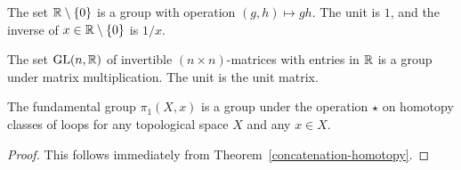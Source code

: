 \begin{example}
  The set $\mathbb{R} \setminus \{0\}$ is a group with operation $(g,h) \mapsto gh$. The unit is $1$, and the inverse of $x \in \mathbb{R} \setminus \{0\}$ is $1/x$.
\end{example}
\begin{example}
  The set $\mathrm{GL}(n,\mathbb{R})$ of invertible $(n \times n)$-matrices with entries in $\mathbb{R}$ is a group under matrix multiplication. The unit is the unit matrix.
\end{example}
\begin{prop}
  The fundamental group $\pi_1(X,x)$ is a group under the operation $\star$ on homotopy classes of loops for any topological space $X$ and any $x \in X$.
\end{prop}
\begin{proof}
  This follows immediately from Theorem~\ref{concatenation-homotopy}.
\end{proof} 

